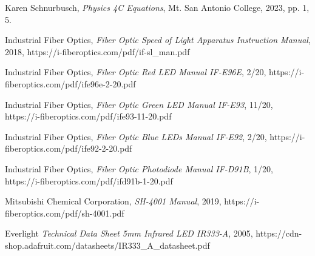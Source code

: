\documentclass[12pt]{iopart} %
\begin{document}
\begin{thebibliography}{9}

  Karen Schnurbusch,
  \textit{Physics 4C Equations},
  Mt. San Antonio College,
  2023,
  pp. 1, 5.

  Industrial Fiber Optics,
  \textit{Fiber Optic Speed of Light Apparatus Instruction Manual},
  2018,
  \mbox{https://i-fiberoptics.com/pdf/if-sl\_man.pdf}

  Industrial Fiber Optics,
  \textit{Fiber Optic Red LED Manual IF-E96E},
  2/20,
  \mbox{https://i-fiberoptics.com/pdf/ife96e-2-20.pdf}

  Industrial Fiber Optics,
  \textit{Fiber Optic Green LED Manual IF-E93},
  11/20,
  \mbox{https://i-fiberoptics.com/pdf/ife93-11-20.pdf}

  Industrial Fiber Optics,
  \textit{Fiber Optic Blue LEDs Manual IF-E92},
  2/20,
  \mbox{https://i-fiberoptics.com/pdf/ife92-2-20.pdf}

  Industrial Fiber Optics,
  \textit{Fiber Optic Photodiode Manual IF-D91B},
  1/20,
  \mbox{https://i-fiberoptics.com/pdf/ifd91b-1-20.pdf}

  Mitsubishi Chemical Corporation,
  \textit{SH-4001 Manual},
  2019,
  \mbox{https://i-fiberoptics.com/pdf/sh-4001.pdf}

  Everlight
  \textit{Technical Data Sheet 5mm Infrared LED IR333-A},
  2005,
  \mbox{https://cdn-shop.adafruit.com/datasheets/IR333\_A\_datasheet.pdf}

\end{thebibliography}
\end{document}
